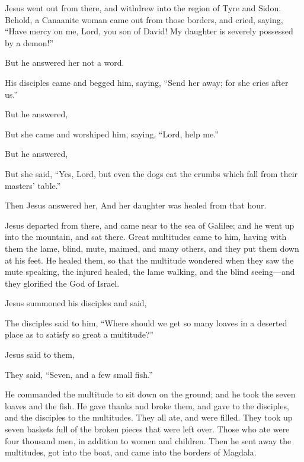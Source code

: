 {{{}}
\par }{\PP {}Jesus went out from there, and withdrew into the region of Tyre and Sidon.
Behold, a Canaanite woman came out from those borders, and cried, saying, “Have mercy on me, Lord, you son of David! My daughter is severely possessed by a demon!”
\par }{\PP {}But he answered her not a word.
\par }{\PP His disciples came and begged him, saying, “Send her away; for she cries after us.”
\par }{\PP {}But he answered,
{}
\par }{\PP {}But she came and worshiped him, saying, “Lord, help me.”
\par }{\PP {}But he answered,
{}
\par }{\PP {}But she said, “Yes, Lord, but even the dogs eat the crumbs which fall from their masters’ table.”
\par }{\PP {}Then Jesus answered her,
{} And her daughter was healed from that hour.
\par }{\PP {}Jesus departed from there, and came near to the sea of Galilee; and he went up into the mountain, and sat there.
Great multitudes came to him, having with them the lame, blind, mute, maimed, and many others, and they put them down at his feet. He healed them,
so that the multitude wondered when they saw the mute speaking, the injured healed, the lame walking, and the blind seeing—and they glorified the God of Israel.
\par }{\PP {}Jesus summoned his disciples and said,
{}
\par }{\PP {}The disciples said to him, “Where should we get so many loaves in a deserted place as to satisfy so great a multitude?”
\par }{\PP {}Jesus said to them,
{}
\par }{\PP They said, “Seven, and a few small fish.”
\par }{\PP {}He commanded the multitude to sit down on the ground;
and he took the seven loaves and the fish. He gave thanks and broke them, and gave to the disciples, and the disciples to the multitudes.
They all ate, and were filled. They took up seven baskets full of the broken pieces that were left over.
Those who ate were four thousand men, in addition to women and children.
Then he sent away the multitudes, got into the boat, and came into the borders of Magdala.

}
